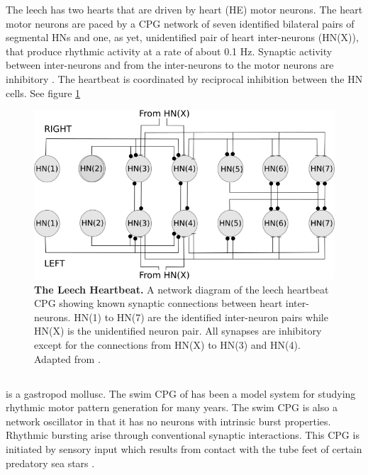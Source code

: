 The leech has two hearts that are driven by heart (HE) motor neurons. The heart motor neurons are paced by a \ac{CPG} network of seven identified bilateral pairs of segmental \acp{HN} and one, as yet, unidentified pair of heart inter-neurons (HN(X)), that produce rhythmic activity at a rate of about 0.1 Hz. Synaptic activity between inter-neurons and from the inter-neurons to the motor neurons are inhibitory \cite{Hill2002, Norris2007}. The heartbeat is coordinated by reciprocal inhibition between the \ac{HN} cells. See figure \ref{fig:leech}

\begin{figure}[H]
	\centering
		\includegraphics[width=\columnwidth]{graphics/leech.png}
		\caption[The Leech Heartbeat.]{\textbf{The Leech Heartbeat.} A network diagram of the leech heartbeat \ac{CPG} showing known synaptic connections between heart inter-neurons. HN(1) to HN(7) are the identified inter-neuron pairs while HN(X) is the unidentified neuron pair. All synapses are inhibitory except for the connections from HN(X) to HN(3) and HN(4). Adapted from \cite{Calabrese1977}.}
		\label{fig:leech}
\end{figure}


\subsection{}
 is a gastropod mollusc. The swim \ac{CPG} of  has been a model system for studying rhythmic motor pattern generation for many years. The  swim \ac{CPG} is also a  network oscillator in that it has no neurons with intrinsic burst properties. Rhythmic bursting arise through conventional synaptic interactions. This \ac{CPG} is initiated by sensory input which results from contact with the tube feet of certain predatory sea stars \cite{Getting1985}.

